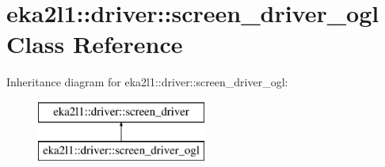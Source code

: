 \hypertarget{classeka2l1_1_1driver_1_1screen__driver__ogl}{}\section{eka2l1\+:\+:driver\+:\+:screen\+\_\+driver\+\_\+ogl Class Reference}
\label{classeka2l1_1_1driver_1_1screen__driver__ogl}
Inheritance diagram for eka2l1\+:\+:driver\+:\+:screen\+\_\+driver\+\_\+ogl\+:\begin{figure}[H]
\begin{center}
\leavevmode
\includegraphics[height=2.000000cm]{classeka2l1_1_1driver_1_1screen__driver__ogl}
\end{center}
\end{figure}
